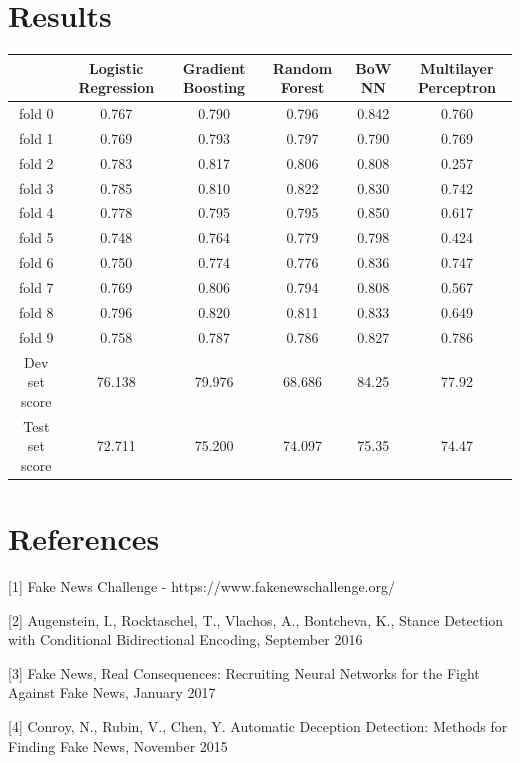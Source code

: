 \documentclass[11pt]{extarticle}
\begin{document}
\section{Results}
\begin{center}
 \begin{tabular}{||c c c c c c||} 
 \hline
  & Logistic Regression & Gradient Boosting & Random Forest  & BoW NN & Multilayer Perceptron \\  
 \hline\hline
 \hline fold 0 & 0.767 &  0.790 & 0.796 & 0.842 & 0.760    \\ [1ex] 
 \hline fold 1 & 0.769 &  0.793 & 0.797 & 0.790 & 0.769   \\ [1ex] 
 \hline fold 2 & 0.783 &  0.817 & 0.806 & 0.808 & 0.257   \\ [1ex] 
 \hline fold 3 & 0.785 &  0.810 & 0.822 & 0.830 & 0.742   \\ [1ex]  
 \hline fold 4 & 0.778 &  0.795 & 0.795 & 0.850 & 0.617   \\ [1ex] 
 \hline fold 5 & 0.748 &  0.764 & 0.779 & 0.798 & 0.424   \\ [1ex] 
 \hline fold 6 & 0.750 &  0.774 & 0.776 & 0.836 & 0.747   \\ [1ex] 
 \hline fold 7 & 0.769 &  0.806 & 0.794 & 0.808 & 0.567   \\ [1ex] 
 \hline fold 8 & 0.796 &  0.820 & 0.811 & 0.833 & 0.649   \\ [1ex] 
 \hline fold 9 & 0.758 &  0.787 & 0.786 & 0.827 & 0.786   \\ [1ex] 
 \hline Dev set score  & 76.138  & 79.976  & 68.686 & 84.25  & 77.92 \\ [1ex] 
 \hline Test set score &  72.711  & 75.200  & 74.097  & 75.35  & 74.47 \\ [1ex] 
 
 \hline
\end{tabular}
\end{center}
\section{References}

[1] Fake News Challenge - https://www.fakenewschallenge.org/

[2] Augenstein, I., Rocktaschel, T., Vlachos, A., Bontcheva, K., Stance Detection with Conditional Bidirectional Encoding, September 2016

[3] Fake News, Real Consequences: Recruiting Neural Networks for the Fight Against Fake News, January 2017

[4] Conroy, N., Rubin, V., Chen, Y. Automatic Deception Detection: Methods for Finding Fake News, November 2015
\end{document}
